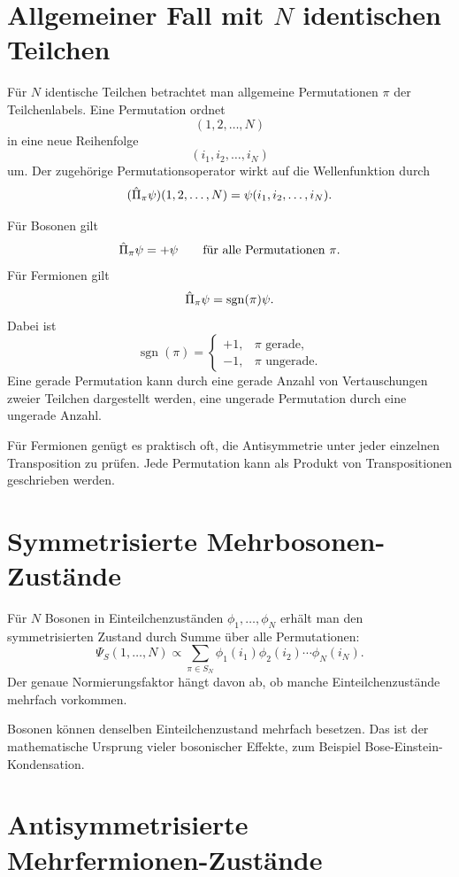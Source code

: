 \section{Allgemeiner Fall mit \texorpdfstring{\(N\)}{N} identischen Teilchen}

Für \(N\) identische Teilchen betrachtet man allgemeine Permutationen \(\pi\) der Teilchenlabels. Eine Permutation ordnet
\[
    (1,2,\dots,N)
\]
in eine neue Reihenfolge
\[
    (i_1,i_2,
    \dots,i_N)
\]
um. Der zugehörige Permutationsoperator wirkt auf die Wellenfunktion durch
\[
    (\hat\Pi_\pi\psi)(1,2,\dots,N)
    =\psi(i_1,i_2,\dots,i_N).
\]

Für Bosonen gilt
\[
    \hat\Pi_\pi\psi=+\psi
    \qquad\text{für alle Permutationen }\pi.
\]
Für Fermionen gilt
\[
    \hat\Pi_\pi\psi=\operatorname{sgn}(\pi)\psi.
\]
Dabei ist
\[
    \operatorname{sgn}(\pi)=
    \begin{cases}
    +1, & \pi\text{ gerade},\\
    -1, & \pi\text{ ungerade}.
    \end{cases}
\]
Eine gerade Permutation kann durch eine gerade Anzahl von Vertauschungen zweier Teilchen dargestellt werden, eine ungerade Permutation durch eine ungerade Anzahl.

\begin{notebox}
Für Fermionen genügt es praktisch oft, die Antisymmetrie unter jeder einzelnen Transposition zu prüfen. Jede Permutation kann als Produkt von Transpositionen geschrieben werden.
\end{notebox}

\section{Symmetrisierte Mehrbosonen-Zustände}

Für \(N\) Bosonen in Einteilchenzuständen \(\phi_1,
\dots,
\phi_N\) erhält man den symmetrisierten Zustand durch Summe über alle Permutationen:
\[
    \Psi_S(1,
\dots,N)
    \propto
    \sum_{\pi\in S_N}
    \phi_1(i_1)\phi_2(i_2)\cdots\phi_N(i_N).
\]
Der genaue Normierungsfaktor hängt davon ab, ob manche Einteilchenzustände mehrfach vorkommen.

\begin{conceptbox}
Bosonen können denselben Einteilchenzustand mehrfach besetzen. Das ist der mathematische Ursprung vieler bosonischer Effekte, zum Beispiel Bose-Einstein-Kondensation.
\end{conceptbox}

\section{Antisymmetrisierte Mehrfermionen-Zustände}


